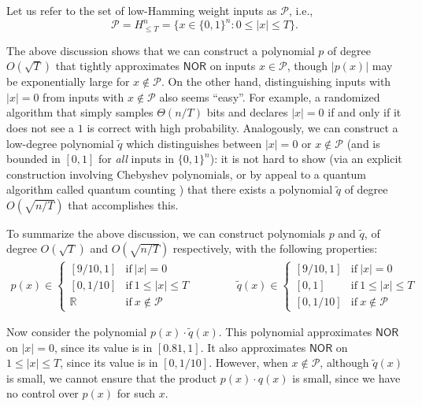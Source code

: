 \documentclass[11pt, letterpaper, fleqn]{article}
\theoremstyle{plain}
\renewcommand{\P}{\mathcal{P}}
\newcommand{\NOR}{\mathsf{ NOR}}
\newcommand{\B}{\{0,1\}}
\begin{document}
Let us refer to the set of low-Hamming weight inputs as $\P$, i.e.,
\begin{equation}
    \P = H^n_{\le T} = \{x\in\B^n: 0\leq |x| \leq T\}. \label{pdefnor}
\end{equation}

The above discussion shows that we can construct a polynomial $p$ of degree $O(\sqrt{T})$ that tightly approximates $\NOR$ on inputs $x\in\P$, though $|p(x)|$ may be exponentially large for $x \notin \P$. 
On the other hand, distinguishing inputs with $|x|=0$ from inputs with $x \notin \P$ also seems ``easy''. 
For example, a randomized algorithm that simply samples $\Theta(n/T)$ bits and declares $|x|=0$ if and only if it does not see a $1$
is correct with high probability. 
Analogously, we can construct a low-degree polynomial $\tilde{q}$ which distinguishes between $|x|=0$ or $x \notin \P$ (and
is bounded in $[0, 1]$ for \emph{all} inputs in $\B^n$):
it is not hard to show (via an explicit construction involving Chebyshev polynomials, or by appeal to a quantum algorithm called quantum counting \cite{quantumcounting})  that there exists a polynomial  $\tilde{q}$ of degree $O(\sqrt{n/T})$ that accomplishes this.

To summarize the above discussion, we can construct polynomials $p$ and $\tilde{q}$, of degree $O(\sqrt{T})$ and $O(\sqrt{n/T})$ respectively, with the following properties:
\begin{align}
p(x) \in \begin{cases} [9/10,1] &\mathrm{if}~ |x| = 0 \\
[0,1/10] & \mathrm{if}~ 1\leq |x| \leq T \\ 
\mathbb{R} & \mathrm{if}~ x \notin \P \end{cases}
\qquad \qquad
\tilde{q}(x) \in \begin{cases} [9/10,1] &\mathrm{if}~ |x| = 0 \\
[0,1] & \mathrm{if}~ 1\leq |x| \leq T \\ 
[0,1/10] & \mathrm{if}~ x \notin \P \end{cases}
\end{align}

Now consider the polynomial $p(x) \cdot \tilde{q}(x)$. This polynomial approximates $\NOR$ on $|x|=0$, since its value is in $[0.81,1]$. 
It also approximates $\NOR$ on $1\leq|x|\leq T$, since its value is in $[0,1/10]$. 
However, when $x \notin \P$, although $\tilde{q}(x)$ is small, we cannot ensure that the product $p(x) \cdot q(x)$ is small,
since we have no control over $p(x)$ for such $x$.
\end{document}
